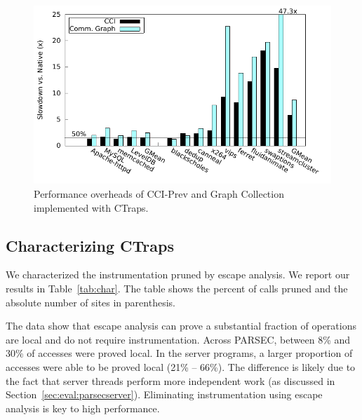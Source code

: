 \documentclass[preprint,9pt]{sigplanconf}
\newcommand{\addtodo}[1]{\textcolor{red}{[To do: #1]}}
\newcommand{\ctraps}{CTraps\xspace}
\begin{document}


\begin{figure}
\centering
\includegraphics[width=.9\columnwidth]{plots/appperf.pdf}
\caption{\label{fig:perfapps}Performance overheads of CCI-Prev and Graph Collection implemented with \ctraps.}
\end{figure}


\subsection{Characterizing \ctraps}
\label{sec:char}
We characterized the instrumentation pruned by escape analysis.  We report our
results in Table~\ref{tab:char}.  The table shows the percent of
calls pruned and the absolute number of sites in parenthesis.

The data show that escape analysis can prove a substantial fraction of
operations are local and do not require instrumentation.  Across PARSEC,
between 8\% and 30\% of accesses were proved local.  In the server programs, a
larger proportion of accesses were able to be proved local (21\% -- 66\%).  The
difference is likely due to the fact that server threads perform more
independent work (as discussed in Section~\ref{sec:eval:parsecserver}).
Eliminating instrumentation using escape analysis is key to high performance.  
\end{document}
